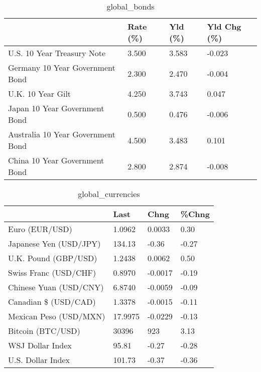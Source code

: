 \documentclass{article}%
\begin{document}
%


\begin{table}[htbp]%
\caption{global\_bonds}%
\centering%
\begin{adjustbox}{width=1\textwidth}%
\begin{tabular}{llll}
\toprule
                                  & Rate (\%) & Yld (\%) & Yld Chg (\%) \\
\midrule
       U.S. 10 Year Treasury Note &    3.500 &   3.583 &      -0.023 \\
  Germany 10 Year Government Bond &    2.300 &   2.470 &      -0.004 \\
                U.K. 10 Year Gilt &    4.250 &   3.743 &       0.047 \\
    Japan 10 Year Government Bond &    0.500 &   0.476 &      -0.006 \\
Australia 10 Year Government Bond &    4.500 &   3.483 &       0.101 \\
    China 10 Year Government Bond &    2.800 &   2.874 &      -0.008 \\
\bottomrule
\end{tabular}
%
\end{adjustbox}%
\end{table}

%


\begin{table}[htbp]%
\caption{global\_currencies}%
\centering%
\begin{adjustbox}{width=1\textwidth}%
\begin{tabular}{llll}
\toprule
                       &    Last &    Chng & \%Chng \\
\midrule
        Euro (EUR/USD) &  1.0962 &  0.0033 &  0.30 \\
Japanese Yen (USD/JPY) &  134.13 &   -0.36 & -0.27 \\
  U.K. Pound (GBP/USD) &  1.2438 &  0.0062 &  0.50 \\
 Swiss Franc (USD/CHF) &  0.8970 & -0.0017 & -0.19 \\
Chinese Yuan (USD/CNY) &  6.8740 & -0.0059 & -0.09 \\
  Canadian \$ (USD/CAD) &  1.3378 & -0.0015 & -0.11 \\
Mexican Peso (USD/MXN) & 17.9975 & -0.0229 & -0.13 \\
     Bitcoin (BTC/USD) &   30396 &     923 &  3.13 \\
      WSJ Dollar Index &   95.81 &   -0.27 & -0.28 \\
     U.S. Dollar Index &  101.73 &   -0.37 & -0.36 \\
\bottomrule
\end{tabular}
%
\end{adjustbox}%
\end{table}
\end{document}
